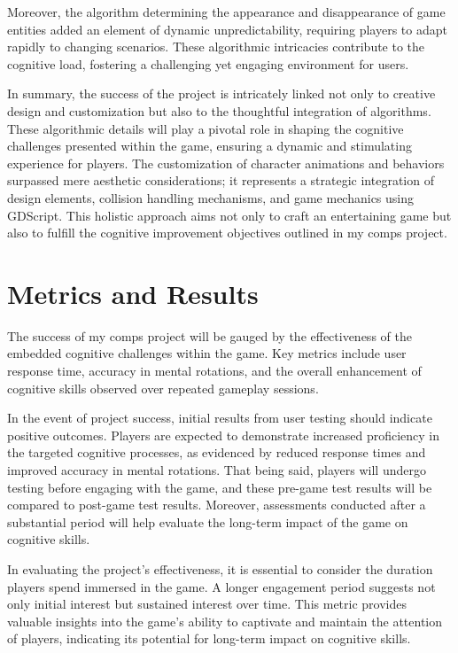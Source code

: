 \documentclass[10pt,twocolumn]{article}
\begin{document}
Moreover, the algorithm determining the appearance and disappearance of game entities added an element of dynamic unpredictability, requiring players to adapt rapidly to changing scenarios. These algorithmic intricacies contribute to the cognitive load, fostering a challenging yet engaging environment for users.

In summary, the success of the project is intricately linked not only to creative design and customization but also to the thoughtful integration of algorithms. These algorithmic details will play a pivotal role in shaping the cognitive challenges presented within the game, ensuring a dynamic and stimulating experience for players. The customization of character animations and behaviors surpassed mere aesthetic considerations; it represents a strategic integration of design elements, collision handling mechanisms, and game mechanics using GDScript. This holistic approach aims not only to craft an entertaining game but also to fulfill the cognitive improvement objectives outlined in my comps project. 


\section{Metrics and Results}
The success of my comps project will be gauged by the effectiveness of the embedded cognitive challenges within the game. Key metrics include user response time, accuracy in mental rotations, and the overall enhancement of cognitive skills observed over repeated gameplay sessions.

In the event of project success, initial results from user testing should indicate positive outcomes. Players are expected to demonstrate increased proficiency in the targeted cognitive processes, as evidenced by reduced response times and improved accuracy in mental rotations. That being said, players will undergo testing before engaging with the game, and these pre-game test results will be compared to post-game test results. Moreover, assessments conducted after a substantial period will help evaluate the long-term impact of the game on cognitive skills.

In evaluating the project's effectiveness, it is essential to consider the duration players spend immersed in the game. A longer engagement period suggests not only initial interest but sustained interest over time. This metric provides valuable insights into the game's ability to captivate and maintain the attention of players, indicating its potential for long-term impact on cognitive skills.
\end{document}
